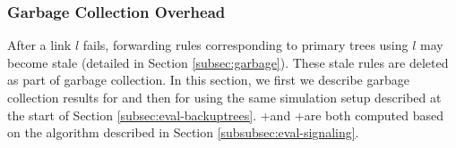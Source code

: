 

\subsubsection{Garbage Collection Overhead}
\label{subsubsec:eval-garbage}

After a link $l$ fails, forwarding rules corresponding to primary trees using $l$ may become stale (detailed in Section \ref{subsec:garbage}).
These stale rules are deleted as part of \mdr garbage collection.  In this section, we first we describe garbage collection results for \post and then for \pre using the same simulation
setup described at the start of Section \ref{subsec:eval-backuptrees}.
\posts+\lb and \pres+\lb are both computed based on the \lb algorithm described in Section \ref{subsubsec:eval-signaling}. %


